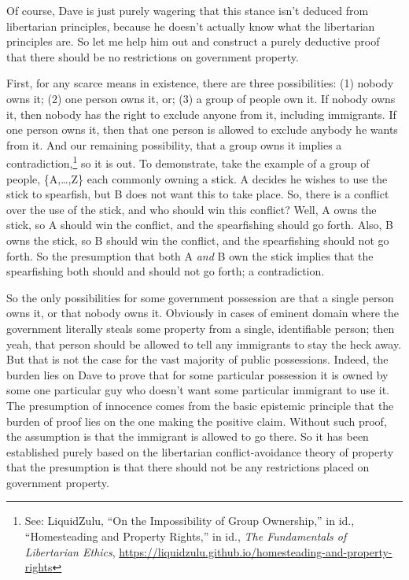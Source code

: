 \documentclass[11pt]{article}
\begin{document}
Of course, Dave is just purely wagering that this stance isn't deduced from libertarian principles, because he doesn't actually know what the libertarian principles are. So let me help him out and construct a purely deductive proof that there should be no restrictions on government property.

First, for any scarce means in existence, there are three possibilities: (1) nobody owns it; (2) one person owns it, or; (3) a group of people own it. If nobody owns it, then nobody has the right to exclude anyone from it, including immigrants. If one person owns it, then that one person is allowed to exclude anybody he wants from it. And our remaining possibility, that a group owns it implies a contradiction,\footnote{See: LiquidZulu, ``On the Impossibility of Group Ownership,'' in id., ``Homesteading and Property Rights,'' in id., \emph{The Fundamentals of Libertarian Ethics}, \url{https://liquidzulu.github.io/homesteading-and-property-rights}} so it is out. To demonstrate, take the example of a group of people, \{A,\ldots{},Z\} each commonly owning a stick. A decides he wishes to use the stick to spearfish, but B does not want this to take place. So, there is a conflict over the use of the stick, and who should win this conflict? Well, A owns the stick, so A should win the conflict, and the spearfishing should go forth. Also, B owns the stick, so B should win the conflict, and the spearfishing should not go forth. So the presumption that both A \emph{and} B own the stick implies that the spearfishing both should and should not go forth; a contradiction.

So the only possibilities for some government possession are that a single person owns it, or that nobody owns it. Obviously in cases of eminent domain where the government literally steals some property from a single, identifiable person; then yeah, that person should be allowed to tell any immigrants to stay the heck away. But that is not the case for the vast majority of public possessions. Indeed, the burden lies on Dave to prove that for some particular possession it is owned by some one particular guy who doesn't want some particular immigrant to use it. The presumption of innocence comes from the basic epistemic principle that the burden of proof lies on the one making the positive claim. Without such proof, the assumption is that the immigrant is allowed to go there. So it has been established purely based on the libertarian conflict-avoidance theory of property that the presumption is that there should not be any restrictions placed on government property.
\end{document}

